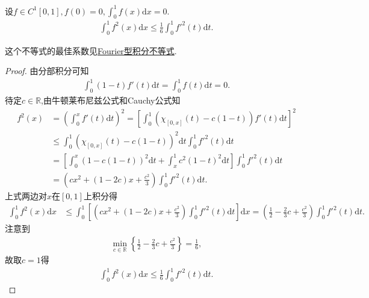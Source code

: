\documentclass[../../main.tex]{subfiles}%
\begin{document}
\begin{example}
设$f\in C^1[0,1],f(0)=0,\int_0^1 f(x)\mathrm{d}x=0.$
\begin{align*}
\int_0^1 f^2(x)\mathrm{d}x\leqslant\frac{1}{6}\int_0^1 f'^2(t)\mathrm{d}t.
\end{align*}
\end{example}
\begin{remark}
这个不等式的最佳系数见\hyperref[theorem:Fourier型积分不等式]{Fourier型积分不等式}.
\end{remark}
\begin{proof}

由分部积分可知
\begin{align*}
\int_0^1 (1-t)f'(t)\mathrm{d}t=\int_0^1 f(t)\mathrm{d}t=0.
\end{align*}
待定$c\in\mathbb{R}$,由牛顿莱布尼兹公式和Cauchy公式知
\begin{align*}
f^2(x)&=\left( \int_0^x f'(t)\mathrm{d}t \right) ^2=\left[ \int_0^1 \left( \chi_{[0,x]}(t)-c(1-t) \right) f'(t)\mathrm{d}t \right] ^2\\
&\leqslant \int_0^1 \left( \chi_{[0,x]}(t)-c(1-t) \right) ^2\mathrm{d}t\int_0^1 f'^2(t)\mathrm{d}t\\
&=\left[ \int_0^x \left( 1-c(1-t) \right) ^2\mathrm{d}t+\int_x^1 c^2(1-t)^2\mathrm{d}t \right] \int_0^1 f'^2(t)\mathrm{d}t\\
&=\left( cx^2+(1-2c)x+\frac{c^2}{3} \right) \int_0^1 f'^2(t)\mathrm{d}t.
\end{align*}
上式两边对$x$在$[0,1]$上积分得
\begin{align*}
\int_0^1 f^2(x)\mathrm{d}x&\leqslant \int_0^1 \left[ \left( cx^2+(1-2c)x+\frac{c^2}{3} \right) \int_0^1 f'^2(t)\mathrm{d}t \right] \mathrm{d}x=\left( \frac{1}{2}-\frac{2}{3}c+\frac{c^2}{3} \right) \int_0^1 f'^2(t)\mathrm{d}t.
\end{align*}
注意到
\begin{align*}
\min\limits_{c\in\mathbb{R}}\left\{ \frac{1}{2}-\frac{2}{3}c+\frac{c^2}{3} \right\} =\frac{1}{6},
\end{align*}
故取$c=1$得
\begin{align*}
\int_0^1 f^2(x)\mathrm{d}x\leqslant\frac{1}{6}\int_0^1 f'^2(t)\mathrm{d}t.
\end{align*}

\end{proof}
\end{document}
